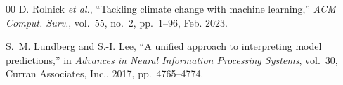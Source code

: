 \documentclass{ieeeaccess}
\begin{document}
\begin{thebibliography}{00}
D. Rolnick \textit{et al.}, ``Tackling climate change with machine learning,'' \textit{ACM Comput. Surv.}, vol.~55, no.~2, pp.~1--96, Feb. 2023.

S.~M. Lundberg and S.-I. Lee, ``A unified approach to interpreting model predictions,'' in \textit{Advances in Neural Information Processing Systems}, vol.~30, Curran Associates, Inc., 2017, pp.~4765--4774.

\end{thebibliography}

\EOD
\end{document}
